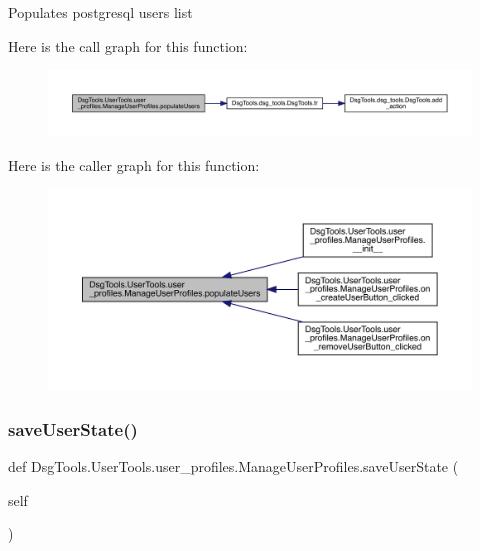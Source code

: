 \begin{DoxyVerb}Populates postgresql users list
\end{DoxyVerb}
 Here is the call graph for this function\+:
\nopagebreak
\begin{figure}[H]
\begin{center}
\leavevmode
\includegraphics[width=350pt]{class_dsg_tools_1_1_user_tools_1_1user__profiles_1_1_manage_user_profiles_aa6fc0358355aa3103a1186f1ee803757_cgraph}
\end{center}
\end{figure}
Here is the caller graph for this function\+:
\nopagebreak
\begin{figure}[H]
\begin{center}
\leavevmode
\includegraphics[width=350pt]{class_dsg_tools_1_1_user_tools_1_1user__profiles_1_1_manage_user_profiles_aa6fc0358355aa3103a1186f1ee803757_icgraph}
\end{center}
\end{figure}
\mbox{\label{class_dsg_tools_1_1_user_tools_1_1user__profiles_1_1_manage_user_profiles_aab13f3c960fb53ba706eff647605712b}} 
\subsubsection{\texorpdfstring{save\+User\+State()}{saveUserState()}}
{\footnotesize\ttfamily def Dsg\+Tools.\+User\+Tools.\+user\+\_\+profiles.\+Manage\+User\+Profiles.\+save\+User\+State (\begin{DoxyParamCaption}\item[{}]{self }\end{DoxyParamCaption})}

